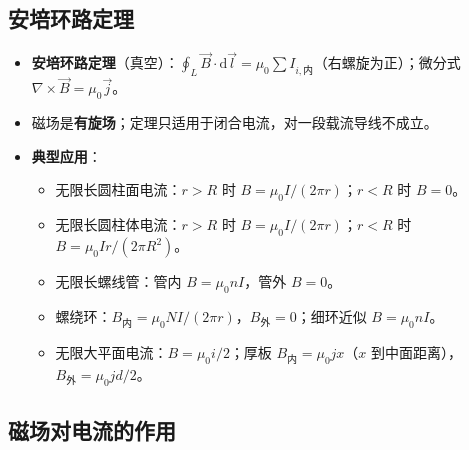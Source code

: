 \documentclass[12pt,a4paper]{ctexart}
\begin{document}
\subsection{安培环路定理}

\begin{itemize}
    \item \textbf{安培环路定理}（真空）：$\displaystyle\oint_L\vec B\cdot\mathrm d\vec l=\mu_0\sum I_{i,\text{内}}$（右螺旋为正）；微分式 $\nabla\times\vec B=\mu_0\vec j$。
    \item 磁场是\textbf{有旋场}；定理只适用于闭合电流，对一段载流导线不成立。
    \item \textbf{典型应用}：
    \begin{itemize}
        \item 无限长圆柱面电流：$r>R$ 时 $B=\mu_0 I/(2\pi r)$；$r<R$ 时 $B=0$。
        \item 无限长圆柱体电流：$r>R$ 时 $B=\mu_0 I/(2\pi r)$；$r<R$ 时 $B=\mu_0 I r/(2\pi R^2)$。
        \item 无限长螺线管：管内 $B=\mu_0 nI$，管外 $B=0$。
        \item 螺绕环：$B_{\text{内}}=\mu_0 NI/(2\pi r)$，$B_{\text{外}}=0$；细环近似 $B=\mu_0 nI$。
        \item 无限大平面电流：$B=\mu_0 i/2$；厚板 $B_{\text{内}}=\mu_0 jx$（$x$ 到中面距离），$B_{\text{外}}=\mu_0 jd/2$。
    \end{itemize}
\end{itemize}

\subsection{磁场对电流的作用}
\end{document}

